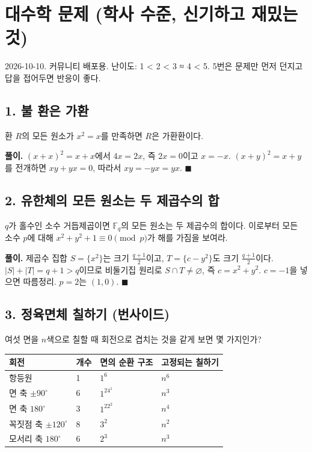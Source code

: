 \section{대수학 문제 (학사 수준, 신기하고 재밌는 것)}

2026-10-10. 커뮤니티 배포용. 난이도: 1 \textless{} 2 \textless{} 3 ≈ 4
\textless{} 5. 5번은 문제만 먼저 던지고 답을 접어두면 반응이 좋다.

\subsection{1. 불 환은 가환}

환 \(R\)의 모든 원소가 \(x^2=x\)를 만족하면 \(R\)은 가환환이다.

\textbf{풀이.} \((x+x)^2=x+x\)에서 \(4x=2x\), 즉 \(2x=0\)이고 \(x=-x\).
\((x+y)^2=x+y\)를 전개하면 \(xy+yx=0\), 따라서 \(xy=-yx=yx\).
\(\blacksquare\)

\subsection{2. 유한체의 모든 원소는 두 제곱수의 합}

\(q\)가 홀수인 소수 거듭제곱이면 \(\mathbb F_q\)의 모든 원소는 두
제곱수의 합이다. 이로부터 모든 소수 \(p\)에 대해
\(x^2+y^2+1\equiv0\pmod p\)가 해를 가짐을 보여라.

\textbf{풀이.} 제곱수 집합 \(S=\{x^2\}\)는 크기 \(\tfrac{q+1}{2}\)이고,
\(T=\{c-y^2\}\)도 크기 \(\tfrac{q+1}{2}\)이다. \(|S|+|T|=q+1>q\)이므로
비둘기집 원리로 \(S\cap T\ne\varnothing\), 즉 \(c=x^2+y^2\). \(c=-1\)을
넣으면 따름정리. \(p=2\)는 \((1,0)\). \(\blacksquare\)

\subsection{3. 정육면체 칠하기 (번사이드)}

여섯 면을 \(n\)색으로 칠할 때 회전으로 겹치는 것을 같게 보면 몇
가지인가?

\begin{longtable}[]{@{}llll@{}}
\toprule\noalign{}
회전 & 개수 & 면의 순환 구조 & 고정되는 칠하기 \\
\midrule\noalign{}
\endhead
\bottomrule\noalign{}
\endlastfoot
항등원 & 1 & \(1^6\) & \(n^6\) \\
면 축 \(\pm90^\circ\) & 6 & \(1^24^1\) & \(n^3\) \\
면 축 \(180^\circ\) & 3 & \(1^22^2\) & \(n^4\) \\
꼭짓점 축 \(\pm120^\circ\) & 8 & \(3^2\) & \(n^2\) \\
모서리 축 \(180^\circ\) & 6 & \(2^3\) & \(n^3\) \\
\end{longtable}

